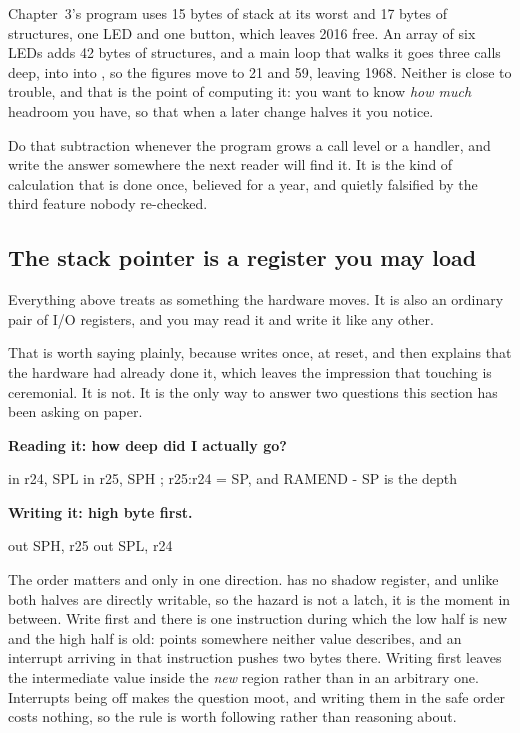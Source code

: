 Chapter~3's program uses 15 bytes of stack at its worst and 17 bytes of structures, one LED and one
button, which leaves 2016 free. An array of six LEDs adds 42 bytes of structures, and a main loop
that walks it goes three calls deep,  into  into
, so the figures move to 21 and 59, leaving 1968. Neither is close to trouble, and
that is the point of computing it: you want to know \emph{how much} headroom you have, so that when
a later change halves it you notice.

Do that subtraction whenever the program grows a call level or a handler, and write the answer
somewhere the next reader will find it. It is the kind of calculation that is done once, believed
for a year, and quietly falsified by the third feature nobody re-checked.

\subsection{The stack pointer is a register you may load}
\label{c4:sec:loadsp}
Everything above treats  as something the hardware moves. It is also an ordinary pair of
I/O registers, and you may read it and write it like any other.

That is worth saying plainly, because  writes  once, at reset, and
then explains that the hardware had already done it, which leaves the impression that touching
 is ceremonial. It is not. It is the only way to answer two questions this section has
been asking on paper.

\textbf{Reading it: how deep did I actually go?}

\begin{asm}
    in   r24, SPL
    in   r25, SPH          ; r25:r24 = SP, and RAMEND - SP is the depth
\end{asm}

\textbf{Writing it: high byte first.}

\begin{asm}
    out  SPH, r25
    out  SPL, r24
\end{asm}

The order matters and only in one direction.  has no shadow register, and unlike
 both halves are directly writable, so the hazard is not a latch, it is the moment in
between. Write  first and there is one instruction during which the low half is new and
the high half is old:  points somewhere neither value describes, and an interrupt arriving
in that instruction pushes two bytes there. Writing  first leaves the intermediate value
inside the \emph{new} region rather than in an arbitrary one. Interrupts being off makes the
question moot, and writing them in the safe order costs nothing, so the rule is worth following
rather than reasoning about.

